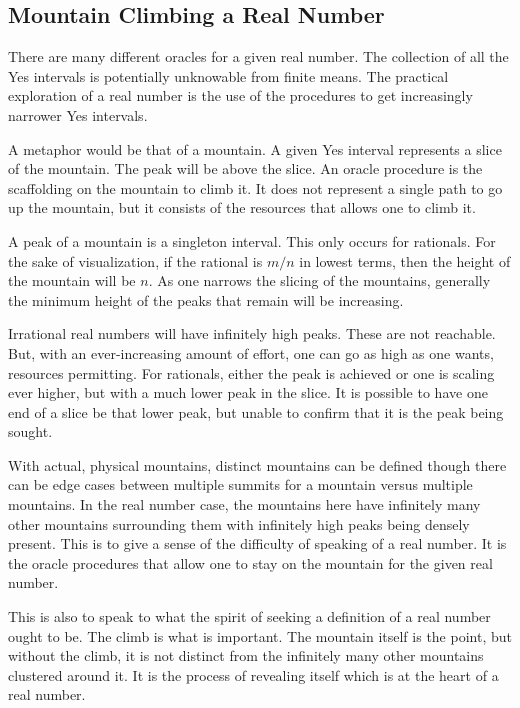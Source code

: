 \subsection{Mountain Climbing a Real Number}

There are many different oracles for a given real number. The collection of all the Yes intervals is potentially unknowable from finite means. The practical exploration of a real number is the use of the procedures to get increasingly narrower Yes intervals.  

A metaphor would be that of a mountain. A given Yes interval represents a slice of the mountain. The peak will be above the slice. An oracle procedure is the scaffolding on the mountain to climb it. It does not represent a single path to go up the mountain, but it consists of the resources that allows one to climb it. 

A peak of a mountain is a singleton interval. This only occurs for rationals. For the sake of visualization, if the rational is $m/n$ in lowest terms, then the height of the mountain will be $n$. As one narrows the slicing of the mountains, generally the minimum height of the peaks that remain will be increasing. 

Irrational real numbers will have infinitely high peaks. These are not reachable. But, with an ever-increasing amount of effort, one can go as high as one wants, resources permitting. For rationals, either the peak is achieved or one is scaling ever higher, but with a much lower peak in the slice. It is possible to have one end of a slice be that lower peak, but unable to confirm that it is the peak being sought. 

With actual, physical mountains, distinct mountains can be defined though there can be edge cases between multiple summits for a mountain versus multiple mountains. In the real number case, the mountains here have infinitely many other mountains surrounding them with infinitely high peaks being densely present. This is to give a sense of the difficulty of speaking of a real number. It is the oracle procedures that allow one to stay on the mountain for the given real number. 

This is also to speak to what the spirit of seeking a definition of a real number ought to be. The climb is what is important. The mountain itself is the point, but without the climb, it is not distinct from the infinitely many other mountains clustered around it. It is the process of revealing itself which is at the heart of a real number. 

